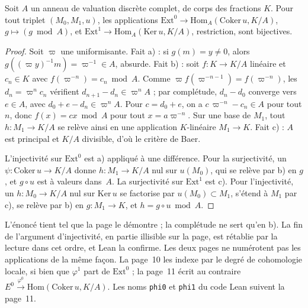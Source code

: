 \begin{encadre}
\begin{theoreme}\label{thm:101-dualite}
Soit $A$ un anneau de valuation discrète complet, de corps des fractions $K$. Pour tout triplet $(M_0, M_1, u)$, les applications $\mathrm{Ext}^0 \to \mathrm{Hom}_A(\mathrm{Coker}\, u, K/A)$, $g \mapsto (g \bmod A)$, et $\mathrm{Ext}^1 \to \mathrm{Hom}_A(\mathrm{Ker}\, u, K/A)$, restriction, sont bijectives.
\end{theoreme}
\end{encadre}

\begin{proof}
Soit $\varpi$ une uniformisante. Fait a) : si $g(m) = y \neq 0$, alors $g((\varpi y)^{-1} m) = \varpi^{-1} \in A$, absurde. Fait b) : soit $f : K \to K/A$ linéaire et $c_n \in K$ avec $f(\varpi^{-n}) = c_n \bmod A$. Comme $\varpi f(\varpi^{-n-1}) = f(\varpi^{-n})$, les $d_n = \varpi^n c_n$ vérifient $d_{n+1} - d_n \in \varpi^n A$ ; par complétude, $d_n - d_0$ converge vers $e \in A$, avec $d_0 + e - d_n \in \varpi^n A$. Pour $c = d_0 + e$, on a $c\,\varpi^{-n} - c_n \in A$ pour tout $n$, donc $f(x) = cx \bmod A$ pour tout $x = a \varpi^{-n}$. Sur une base de $M_1$, tout $h : M_1 \to K/A$ se relève ainsi en une application $K$-linéaire $M_1 \to K$. Fait c) : $A$ est principal et $K/A$ divisible, d'où le critère de Baer.

L'injectivité sur $\mathrm{Ext}^0$ est a) appliqué à une différence. Pour la surjectivité, un $\psi : \mathrm{Coker}\, u \to K/A$ donne $h : M_1 \to K/A$ nul sur $u(M_0)$, qui se relève par b) en $g$, et $g \circ u$ est à valeurs dans~$A$. La surjectivité sur $\mathrm{Ext}^1$ est c). Pour l'injectivité, un $h : M_0 \to K/A$ nul sur $\mathrm{Ker}\, u$ se factorise par $u(M_0) \subset M_1$, s'étend à $M_1$ par c), se relève par b) en $g : M_1 \to K$, et $h = g \circ u \bmod A$.
\end{proof}

\begin{remarque}
L'énoncé tient tel que la page le démontre ; la complétude ne sert qu'en b). La fin de l'argument d'injectivité, en partie illisible sur la page, est rétablie par la lecture dans cet ordre, et Lean la confirme. Les deux pages ne numérotent pas les applications de la même façon. La page~10 les indexe par le degré de cohomologie locale, si bien que $\varphi^1$ part de $\mathrm{Ext}^0$ ; la page~11 écrit au contraire $E^0 \xrightarrow{\varphi^0} \mathrm{Hom}(\mathrm{Coker}\, u, K/A)$. Les noms \texttt{phi0} et \texttt{phi1} du code Lean suivent la page~11.
\end{remarque}

